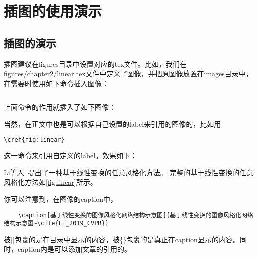 \chapter{插图的使用演示}

\label{chap:figure}
\section{插图的演示}

插图建议在figures目录中设置对应的tex文件。比如，我们在figures/chapter2/linear.tex文件中定义了图像，并把原图像放置在images目录中，在需要时使用如下命令插入图像：
\begin{verbatim}

\end{verbatim}
上面命令的作用就插入了如下图像：


当然，在正文中也是可以根据自己设置的label来引用的图像的，比如用
\begin{verbatim}
\cref{fig:linear}
\end{verbatim}
这一命令来引用自定义的label。效果如下：

Li等人~\cite{Li_2019_CVPR}提出了一种基于线性变换的任意风格化方法。
完整的基于线性变换的任意风格化方法如\cref{fig:linear}所示。

你可以注意到，在图像的caption中，
\begin{verbatim}
    \caption[基于线性变换的图像风格化网络结构示意图]{基于线性变换的图像风格化网络结构示意图~\cite{Li_2019_CVPR}}
\end{verbatim}
被[]包裹的是在目录中显示的内容，被\{\}包裹的是真正在caption显示的内容。同时，caption内是可以添加文章的引用的。